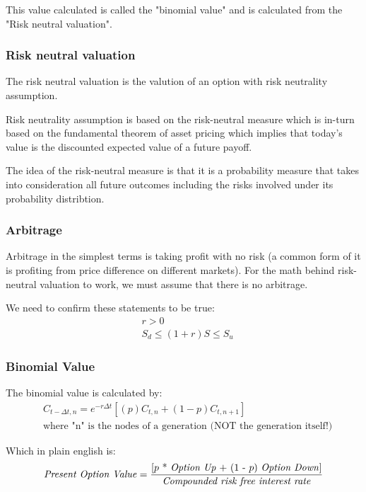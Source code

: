 \documentclass[12pt, letterpaper]{article}
\begin{document}
This value calculated is called the "binomial value" and is calculated from the "Risk neutral valuation".

\subsubsection*{Risk neutral valuation}
The risk neutral valuation is the valution of an option with risk neutrality assumption.

Risk neutrality assumption is based on the risk-neutral measure which is in-turn based on the fundamental theorem of asset pricing which implies that today's value is the discounted expected value of a future payoff.

The idea of the risk-neutral measure is that it is a probability measure that takes into consideration all future outcomes including the risks involved under its probability distribtion.


\subsubsection*{Arbitrage}
Arbitrage in the simplest terms is taking profit with no risk (a common form of it is profiting from price difference on different markets).
For the math behind risk-neutral valuation to work, we must assume that there is no arbitrage.

We need to confirm these statements to be true:
\begin{align*}
  & {r > 0} \\
  & S_d \leq (1+r)S \leq S_u
\end{align*}


\subsubsection*{Binomial Value}
The binomial value is calculated by:
\begin{align*}
  & C_{t-\Delta t, n} = e^{-r\Delta t} [(p)C_{t,n} + (1-p)C_{t,n+1}] \\
  & \textrm{where "n" is the nodes of a generation (NOT the generation itself!)}
\end{align*}


Which in plain english is:
\begin{equation*}
  \textrm{\textit{Present Option Value}} = \frac{\textrm{[${p}$ * \textit{Option Up} + (1 - ${p}$) \textit{Option Down}]}}{\textrm{\textit{Compounded risk free interest rate}}}
\end{equation*}
\end{document}
